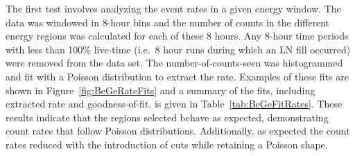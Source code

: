 	The first test involves analyzing the event rates in a given energy window.  The data was windowed in 8-hour bins and the number of counts in the different energy regions was calculated for each of these 8 hours.  Any 8-hour time periods with less than 100\% live-time (i.e.~8 hour runs during which an LN fill occurred) were removed from the data set.  The number-of-counts-seen was histogrammed and fit with a Poisson distribution to extract the rate.  Examples of these fits are shown in	Figure~\ref{fig:BeGeRateFits} and a summary of the fits, including extracted rate and goodness-of-fit, is given in Table~\ref{tab:BeGeFitRates}.  These results indicate that the regions selected behave as expected, demonstrating count rates that follow Poisson distributions.  Additionally, as expected the count rates reduced with the introduction of cuts while retaining a Poisson shape.  
	
